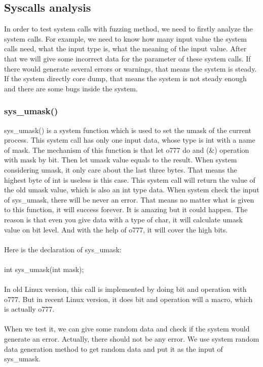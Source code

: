 \documentclass[twoside]{article}
\begin{document}
\begin{multicols}{2}
\subsection{Syscalls analysis}
In order to test system calls with fuzzing method, we need to firstly analyze the system calls. For example, we need to know how many input value the system calls need, what the input type is, what the meaning of the input value. After that we will give some incorrect data for the parameter of these system calls. If there would generate several errors or warnings, that means the system is steady. If the system directly core dump, that means the system is not steady enough and there are some bugs inside the system.
\subsubsection{sys\_umask()}
sys\_umask() is a system function which is used to set the umask of the current process. This system call has only one input data, whose type is int with a name of mask. The mechanism of this function is that let o777 do and (\&) operation with mask by bit. Then let umask value equals to the result. When system considering umask, it only care about the last three bytes. That means the highest byte of int is useless is this case. This system call will return the value of the old umask value, which is also an int type data. When system check the input of sys\_umask, there will be never an error. That means no matter what is given to this function, it will success forever. It is amazing but it could happen. The reason is that even you give data with a type of char, it will calculate umask value on bit level. And with the help of o777, it will cover the high bits.\\\\
Here is the declaration of sys\_umask:\\\\
int sys\_umask(int mask);\\\\
In old Linux version, this call is implemented by doing bit and operation with o777. But in recent Linux version, it does bit and operation will a macro, which is actually o777.\\\\
When we test it, we can give some random data and check if the system would generate an error. Actually, there should not be any error. We use system random data generation method to get random data and put it as the input of sys\_umask.

\end{multicols}
\end{document}
